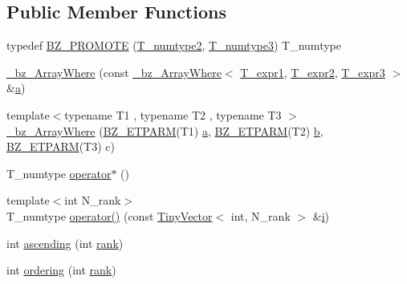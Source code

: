 \subsection*{Public Member Functions}
\begin{DoxyCompactItemize}
\item 
typedef \hyperlink{class__bz__ArrayWhere_a3207c7778ec98e62ae4218fc364f2ea3}{B\+Z\+\_\+\+P\+R\+O\+M\+O\+T\+E} (\hyperlink{class__bz__ArrayWhere_ab9f464ff11ad352449616df25015af39}{T\+\_\+numtype2}, \hyperlink{class__bz__ArrayWhere_a783ce23201ab34ad6e6e9f6d490102e3}{T\+\_\+numtype3}) T\+\_\+numtype
\item 
\hyperlink{class__bz__ArrayWhere_a1f8775abc51266c3d595bb26a0429928}{\+\_\+bz\+\_\+\+Array\+Where} (const \hyperlink{class__bz__ArrayWhere}{\+\_\+bz\+\_\+\+Array\+Where}$<$ \hyperlink{class__bz__ArrayWhere_a04df7e7b7c476f0412969686fe06b7eb}{T\+\_\+expr1}, \hyperlink{class__bz__ArrayWhere_aa417b5b88df486cc569c08a17c071aac}{T\+\_\+expr2}, \hyperlink{class__bz__ArrayWhere_a45f842d24f1a76bd7b277cc81c4a1168}{T\+\_\+expr3} $>$ \&\hyperlink{gen__mat5files_8m_aae328bf20413f220e38aec4d95bfd6da}{a})
\item 
{\footnotesize template$<$typename T1 , typename T2 , typename T3 $>$ }\\\hyperlink{class__bz__ArrayWhere_abf8f64ba612426344b26681809428cda}{\+\_\+bz\+\_\+\+Array\+Where} (\hyperlink{tuning_8h_a92a6f3aa8f4cd5ac9b4239c449892bb7}{B\+Z\+\_\+\+E\+T\+P\+A\+R\+M}(T1) \hyperlink{gen__mat5files_8m_aae328bf20413f220e38aec4d95bfd6da}{a}, \hyperlink{tuning_8h_a92a6f3aa8f4cd5ac9b4239c449892bb7}{B\+Z\+\_\+\+E\+T\+P\+A\+R\+M}(T2) \hyperlink{gen__mat5files_8m_a7b38767b3b6a8dae167e5afa4fc340b0}{b}, \hyperlink{tuning_8h_a92a6f3aa8f4cd5ac9b4239c449892bb7}{B\+Z\+\_\+\+E\+T\+P\+A\+R\+M}(T3) c)
\item 
T\+\_\+numtype \hyperlink{class__bz__ArrayWhere_ad189ff0040aa7b48c84a3235c9eb504b}{operator$\ast$} ()
\item 
{\footnotesize template$<$int N\+\_\+rank$>$ }\\T\+\_\+numtype \hyperlink{class__bz__ArrayWhere_aa18e8a3dc4ee999dcd5b5f955406fefc}{operator()} (const \hyperlink{classTinyVector}{Tiny\+Vector}$<$ int, N\+\_\+rank $>$ \&\hyperlink{indexexpr_8h_aabd77643995707c185e95c8cb2782c81}{i})
\item 
int \hyperlink{class__bz__ArrayWhere_a5f7071d416bfe882dd7da0ffad08c09a}{ascending} (int \hyperlink{class__bz__ArrayWhere_ad72a01a0949053944abf6f1e4da15f67}{rank})
\item 
int \hyperlink{class__bz__ArrayWhere_a4d24b26f2688632d066cb4b2b2d53c0c}{ordering} (int \hyperlink{class__bz__ArrayWhere_ad72a01a0949053944abf6f1e4da15f67}{rank})

\end{DoxyCompactItemize}
